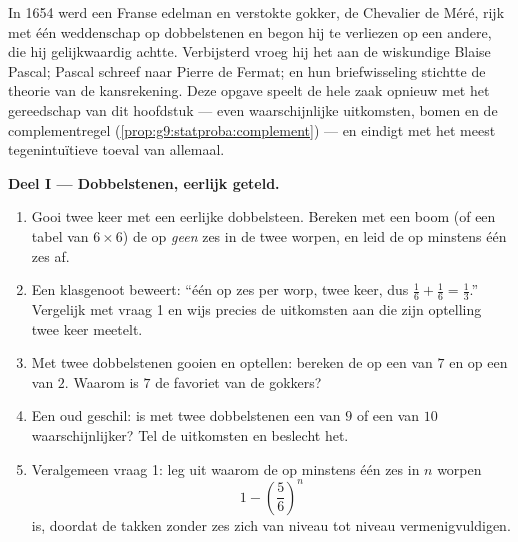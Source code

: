 \begin{problem}
\label{pb:g9:statproba:1}
In 1654 werd een Franse edelman en verstokte gokker, de Chevalier de Méré, rijk met
één weddenschap op dobbelstenen en begon hij te verliezen op een andere, die hij
gelijkwaardig achtte. Verbijsterd vroeg hij het aan de wiskundige Blaise Pascal;
Pascal schreef naar Pierre de Fermat; en hun briefwisseling stichtte de theorie van
de kansrekening. Deze opgave speelt de hele zaak opnieuw met het gereedschap van dit
hoofdstuk --- even waarschijnlijke uitkomsten, bomen en de complementregel
(\cref{prop:g9:statproba:complement}) --- en eindigt met het meest tegenintuïtieve
toeval van allemaal.

\medskip
\noindent\textbf{Deel I --- Dobbelstenen, eerlijk geteld.}
\begin{enumerate}
  \item Gooi twee keer met een eerlijke dobbelsteen. Bereken met een boom (of een
        tabel van $6 \times 6$) de  op \emph{geen} zes in de twee worpen, en
        leid de  op minstens één zes af.
  \item Een klasgenoot beweert: ``één  op zes per worp, twee keer, dus
        $\frac16 + \frac16 = \frac13$.'' Vergelijk met vraag 1 en wijs precies de
        uitkomsten aan die zijn optelling twee keer meetelt.
  \item Met twee dobbelstenen gooien en optellen: bereken de  op een  van
        $7$ en op een  van $2$. Waarom is $7$ de favoriet van de gokkers?
  \item Een oud geschil: is met twee dobbelstenen een  van $9$ of een  van
        $10$ waarschijnlijker? Tel de uitkomsten en beslecht het.
  \item Veralgemeen vraag 1: leg uit waarom de  op minstens één zes in $n$
        worpen
        \[
        1 - \left(\frac56\right)^{\!n}
        \]
        is, doordat de takken zonder zes zich van niveau tot niveau
        vermenigvuldigen.
\end{enumerate}


\end{problem}

